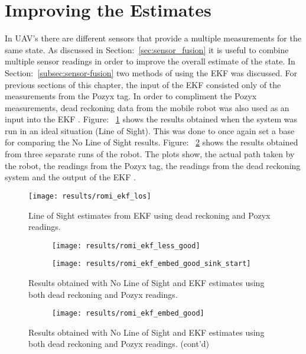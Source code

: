 \section{Improving the Estimates}\label{sec:improving-the-estimates}
In UAV's there are different sensors that provide a multiple measurements for the same state.
As discussed in Section:~\ref{sec:sensor_fusion} it is useful to combine multiple sensor readings in order to improve the overall estimate of the state.
In Section:~\ref{subsec:sensor-fusion} two methods of using the EKF was discussed.
For previous sections of this chapter, the input of the EKF consisted only of the measurements from the Pozyx tag.
In order to compliment the Pozyx measurements, dead reckoning data from the mobile robot was also used as an input into the EKF .
Figure: ~\ref{fig:romi_los} shows the results obtained when the system was run in an ideal situation (Line of Sight).
This was done to once again set a base for comparing the No Line of Sight results.
Figure: ~\ref{fig:romi_nlos_ekf} shows the results obtained from three separate runs of the robot.
The plots show, the actual path taken by the robot, the readings from the Pozyx tag, the readings from the dead reckoning system and the output of the EKF .
\begin{figure}[ht!]
    \centering
    \texttt{[image: results/romi\_ekf\_los]}
    \caption{Line of Sight estimates from EKF using dead reckoning and Pozyx readings.}
    \label{fig:romi_los}
\end{figure}

\begin{figure}[ht!]
    \centering
    \begin{subfigure}{0.7\textwidth}
            \texttt{[image: results/romi\_ekf\_less\_good]}
    \end{subfigure}
    \begin{subfigure}{0.7\textwidth}
            \texttt{[image: results/romi\_ekf\_embed\_good\_sink\_start]}
    \end{subfigure}
    \caption{Results obtained with No Line of Sight and EKF estimates using both dead reckoning and Pozyx readings.}
    \label{fig:romi_nlos_ekf}
\end{figure}
\begin{figure}[ht!]\ContinuedFloat
    \centering
    \begin{subfigure}{0.7\textwidth}
            \texttt{[image: results/romi\_ekf\_embed\_good]}
    \end{subfigure}
    \caption[]{Results obtained with No Line of Sight and EKF estimates using both dead reckoning and Pozyx readings. (cont'd)}
\end{figure}
\newpage
